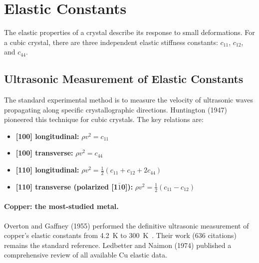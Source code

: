 \section{Elastic Constants}

The elastic properties of a crystal describe its response to small deformations. For a cubic crystal, there are three independent elastic stiffness constants: $c_{11}$, $c_{12}$, and $c_{44}$.

\subsection{Ultrasonic Measurement of Elastic Constants}

The standard experimental method is to measure the velocity of ultrasonic waves propagating along specific crystallographic directions. Huntington (1947) pioneered this technique for cubic crystals. The key relations are:

\begin{itemize}[nosep]
  \item \textbf{[100] longitudinal:} $\rho v^2 = c_{11}$
  \item \textbf{[100] transverse:} $\rho v^2 = c_{44}$
  \item \textbf{[110] longitudinal:} $\rho v^2 = \tfrac{1}{2}(c_{11} + c_{12} + 2c_{44})$
  \item \textbf{[110] transverse (polarized [1$\bar{1}$0]):} $\rho v^2 = \tfrac{1}{2}(c_{11} - c_{12})$
\end{itemize}

\paragraph{Copper: the most-studied metal.} Overton and Gaffney (1955) performed the definitive ultrasonic measurement of copper's elastic constants from \SI{4.2}{\kelvin} to \SI{300}{\kelvin}~\cite{overton1955elastic}. Their work (636 citations) remains the standard reference. Ledbetter and Naimon (1974) published a comprehensive review of all available Cu elastic data.

